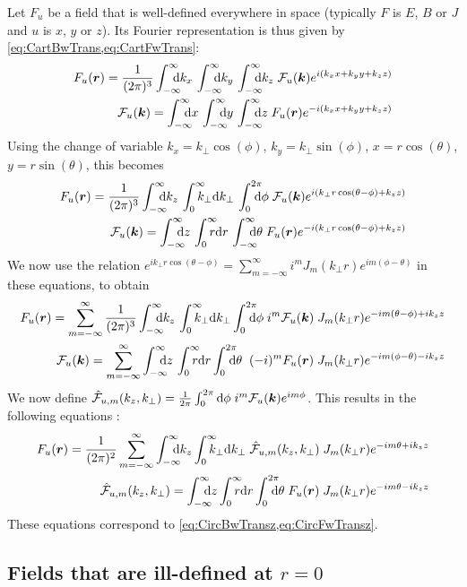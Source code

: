 Let $F_u$ be a field that is well-defined everywhere in space
(typically $F$ is $E$, $B$ or $J$ and $u$ is $x$, $y$ or $z$). Its Fourier representation
is thus given by \cref{eq:CartBwTrans,eq:CartFwTrans}:
\begin{align*}
F_u(\vec{r}) = \frac{1}{(2\pi)^{3}}\Integ{k_x} \,\Integ{k_y}\,
\Integ{k_z} \; \mathcal{F}_u(\vec{k}) e^{i(k_x x + k_y y + k_z z)} \\
\mathcal{F}_u(\vec{k})  = \Integ{x} \,\Integ{y}\,
\Integ{z} \; F_u(\vec{r}) e^{-i(k_x x + k_y y + k_z z)} 
\end{align*}
Using the change of variable $k_x=k_\perp\cos(\phi)$, $k_y = k_\perp\sin(\phi)$,
$x=r\cos(\theta)$, $y=r\sin(\theta)$, this becomes
 \begin{align*}
F_u(\vec{r}) = \frac{1}{(2\pi)^{3}}\Integ{k_z} \,\RInteg{k_\perp}\,
\TInteg{\phi} \; \mathcal{F}_u(\vec{k})
e^{i(k_\perp r \cos(\theta-\phi) + k_z z)} \\
\mathcal{F}_u(\vec{k})   = \Integ{z} \,\RInteg{r}\,
\Integ{\theta} \; F_u(\vec{r}) e^{-i(k_\perp r \cos(\theta-\phi) + k_z z)} 
\end{align*}
We now use the relation $e^{ik_\perp r\cos(\theta-\phi)} =
\sum_{m=-\infty}^{\infty} i^m J_m(k_\perp r) e^{im(\phi-\theta)}$ in these equations, to obtain
\begin{align*}
F_u (\vec{r})  = \sum_{m=-\infty}^{\infty} \frac{1}{(2\pi)^{3}}\Integ{k_z} \,\RInteg{k_\perp }
\TInteg{\phi} \; i^m \mathcal{F}_u(\vec{k}) \;
J_m(k_\perp r) e^{-im(\theta-\phi) + ik_z z} \\
\mathcal{F}_u(\vec{k})   =  \sum_{m=-\infty}^{\infty} \Integ{z} \,\RInteg{r}
\TInteg{\theta} \;\; (-i)^m F_u(\vec{r}) \; J_m(k_\perp r) e^{-im(\phi-\theta) -ik_z z} 
\end{align*}
We now define $\hat{\mathcal{F}}_{u,m}(k_z,k_\perp ) = \frac{1}{2\pi}\int_0^{2\pi}
\mathrm{d}\phi \; i^m \mathcal{F}_u(\boldsymbol{k})
e^{im\phi}$. This results in the following equations :
\begin{align}
F_u(\vec{r}) =  \frac{1}{(2\pi)^2}\sum_{m=-\infty}^{\infty} \Integ{k_z}
\RInteg{k_\perp }\; \spectral{F}_{u,m}(k_z,k_\perp ) \; J_m(k_\perp r) e^{-im\theta + ik_z z} 
\\
\spectral{F}_{u,m}(k_z,k_\perp ) = \Integ{z} \RInteg{r}
\TInteg{\theta} \;F_u(\vec{r})\; J_m(k_\perp r) e^{-im\theta
 - i k_z z} \label{eq:CircBwTransu}
\end{align}
These equations correspond to \cref{eq:CircBwTransz,eq:CircFwTransz}.

\subsection{Fields that are ill-defined at $r=0$}

